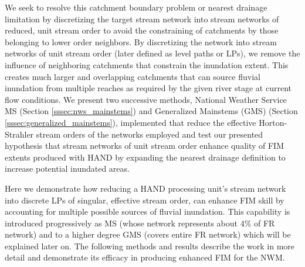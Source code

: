 \documentclass[draft]{dependencies/agujournal2019}
\begin{document}
We seek to resolve this catchment boundary problem or nearest drainage limitation by discretizing the target stream network into stream networks of reduced, unit stream order to avoid the constraining of catchments by those belonging to lower order neighbors.
By discretizing the network into stream networks of unit stream order (later defined as level paths or LPs), we remove the influence of neighboring catchments that constrain the inundation extent.
This creates much larger and overlapping catchments that can source fluvial inundation from multiple reaches as required by the given river stage at current flow conditions.
We present two successive methods, National Weather Service MS (Section \ref{sssec:nws_mainstems}) and Generalized Mainstems (GMS) (Section \ref{sssec:generalized_mainstems}), implemented that reduce the effective Horton-Strahler stream orders of the networks employed and test our presented hypothesis that stream networks of unit stream order enhance quality of FIM extents produced with HAND by expanding the nearest drainage definition to increase potential inundated areas.

Here we demonstrate how reducing a HAND processing unit's stream network into discrete LPs of singular, effective stream order, can enhance FIM skill by accounting for multiple possible sources of fluvial inundation.
This capability is introduced progressively as MS (whose network represents about 4\% of FR network) and to a higher degree GMS (covers entire FR network) which will be explained later on.
The following methods and results describe the work in more detail and demonstrate its efficacy in producing enhanced FIM for the NWM.
%
\clearpage %
\end{document}
